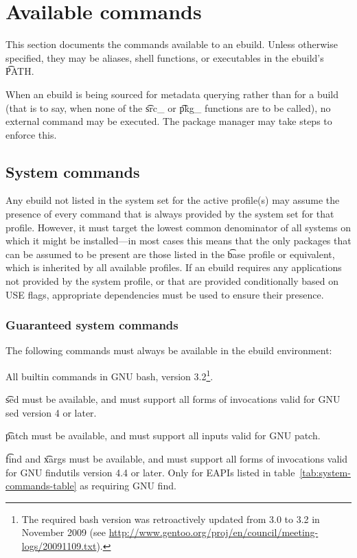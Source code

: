 \section{Available commands}
\label{sec:ebuild-env-commands}

This section documents the commands available to an ebuild. Unless otherwise specified, they may be
aliases, shell functions, or executables in the ebuild's \t{PATH}.

When an ebuild is being sourced for metadata querying rather than for a build (that is to say,
when none of the \t{src\_} or \t{pkg\_} functions are to be called), no external command may
be executed. The package manager may take steps to enforce this.

\subsection{System commands}

Any ebuild not listed in the system set for the active profile(s) may assume the presence of every
command that is always provided by the system set for that profile. However, it must target the
lowest common denominator of all systems on which it might be installed---in most cases this means
that the only packages that can be assumed to be present are those listed in the \t{base} profile or
equivalent, which is inherited by all available profiles. If an ebuild requires any applications not
provided by the system profile, or that are provided conditionally based on USE flags, appropriate
dependencies must be used to ensure their presence.

\subsubsection{Guaranteed system commands}
\label{sec:guaranteed-system-commands}

The following commands must always be available in the ebuild environment:
\begin{compactitem}
\item All builtin commands in GNU bash, version 3.2\footnote{The
    required bash version was retroactively updated from 3.0 to 3.2 in
    November 2009 (see \url{http://www.gentoo.org/proj/en/council/meeting-logs/20091109.txt}).\label{fn:bash3.2}}.
\item \t{sed} must be available, and must support all forms of invocations valid for GNU sed
    version 4 or later.
\item \t{patch} must be available, and must support all inputs valid for GNU patch.
\item \t{find} and \t{xargs} must be available, and must support all forms of invocations valid
    for GNU findutils version 4.4 or later. Only for EAPIs listed in
    table~\ref{tab:system-commands-table} as requiring GNU find. 
\end{compactitem}

